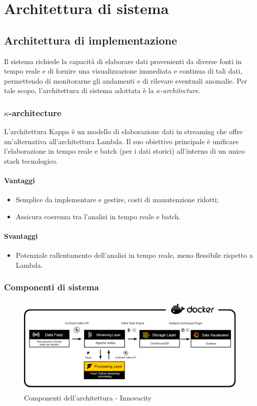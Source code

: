 \section{Architettura di sistema}
\subsection{Architettura di implementazione}
Il sistema richiede la capacità di elaborare dati provenienti da diverse fonti in tempo reale e di fornire una visualizzazione immediata e continua di tali dati, permettendo di monitorarne gli andamenti e di rilevare eventuali anomalie. 
Per tale scopo, l'architettura di sistema adottata è la \textit{$\kappa$-architecture}.

\subsubsection{$\kappa$-architecture}
L'architettura Kappa è un modello di elaborazione dati in streaming che offre un'alternativa all'architettura Lambda. Il suo obiettivo principale è unificare l'elaborazione in tempo reale e batch (per i dati storici) all'interno di un unico stack tecnologico.
\paragraph{Vantaggi}
\begin{itemize}
    \item Semplice da implementare e gestire, costi di manutenzione ridotti;
    \item Assicura coerenza tra l'analisi in tempo reale e batch.
\end{itemize}
\paragraph*{Svantaggi}
\begin{itemize}
    \item Potenziale rallentamento dell'analisi in tempo reale, meno flessibile rispetto a Lambda.
\end{itemize}

\subsubsection{Componenti di sistema}
\begin{figure}[H]
    \centering
    \includegraphics[width=1\textwidth]{../Images/SpecificaTecnica/Architettura_PB_microservices2.png}
    \caption{Componenti dell'architettura - Innovacity}
    \label{fig: fdf}
\end{figure}

